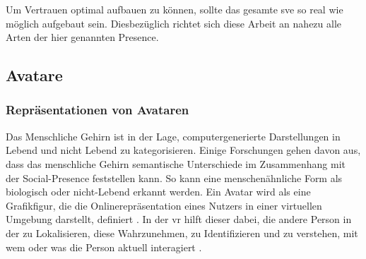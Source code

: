 \documentclass[a4paper,11pt]{article}%
\renewcommand{\\}{\vspace*{0.5\baselineskip} \newline}
\begin{document}
Um Vertrauen optimal aufbauen zu können, sollte das gesamte \ac{sve} so real wie möglich aufgebaut sein. Diesbezüglich richtet sich diese Arbeit an nahezu alle Arten der hier genannten \dq{}Presence\dq{}.


\newpage

\subsection{Avatare}
\label{Avatare}
\subsubsection{Repräsentationen von Avataren}

Das Menschliche Gehirn ist in der Lage, computergenerierte Darstellungen in \dq{}Lebend und nicht Lebend\dq{} zu kategorisieren. Einige Forschungen gehen davon aus, dass das menschliche Gehirn semantische Unterschiede im Zusammenhang mit der \dq{}Social-Presence\dq{} feststellen kann. So kann eine menschenähnliche Form als biologisch oder nicht-Lebend erkannt werden. 
Ein Avatar wird als eine Grafikfigur, die die Onlinerepräsentation eines Nutzers in einer virtuellen Umgebung darstellt, definiert \citep[p.1]{neustaedter2009presenting}. In der \ac{vr} hilft dieser dabei, die andere Person in der zu Lokalisieren, diese Wahrzunehmen, zu Identifizieren und zu verstehen, mit wem oder was die Person aktuell interagiert \citep[]{pan2017impact}.
\end{document}
